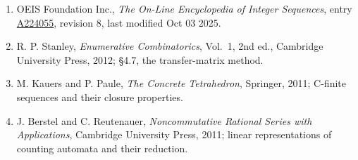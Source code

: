 \documentclass[11pt]{article}
\theoremstyle{definition}
\begin{document}
\begin{enumerate}

\item OEIS Foundation Inc., \emph{The On-Line Encyclopedia of Integer Sequences}, entry \href{https://oeis.org/A224055}{A224055}, revision 8, last modified Oct 03 2025.

\item R. P. Stanley, \emph{Enumerative Combinatorics}, Vol.~1, 2nd ed., Cambridge University Press, 2012; \S4.7, the transfer-matrix method.

\item M. Kauers and P. Paule, \emph{The Concrete Tetrahedron}, Springer, 2011; C-finite sequences and their closure properties.

\item J. Berstel and C. Reutenauer, \emph{Noncommutative Rational Series with Applications}, Cambridge University Press, 2011; linear representations of counting automata and their reduction.

\end{enumerate}
\end{document}
